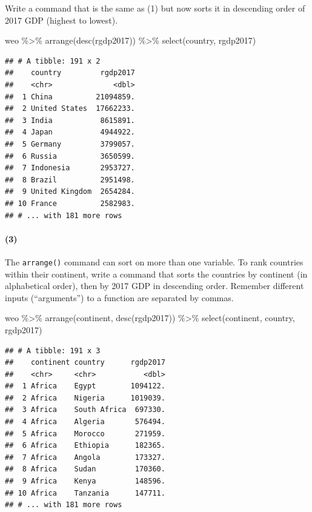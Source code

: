 \documentclass[11pt]{article}
\newcommand{\code}[1]{\colorbox{light-gray}{\texttt{#1}}}
\newenvironment{Shaded}{\begin{snugshade}}{\end{snugshade}}
\newcommand{\FunctionTok}[1]{\textcolor[rgb]{0.00,0.00,0.00}{#1}}
\newcommand{\NormalTok}[1]{#1}
\newcommand{\SpecialCharTok}[1]{\textcolor[rgb]{0.00,0.00,0.00}{#1}}
\begin{document}
Write a command that is the same as (1) but now sorts it in descending
order of 2017 GDP (highest to lowest).

\begin{Shaded}
\begin{Highlighting}[]
\NormalTok{weo }\SpecialCharTok{\%\textgreater{}\%}
  \FunctionTok{arrange}\NormalTok{(}\FunctionTok{desc}\NormalTok{(rgdp2017)) }\SpecialCharTok{\%\textgreater{}\%}
  \FunctionTok{select}\NormalTok{(country, rgdp2017)}
\end{Highlighting}
\end{Shaded}

\begin{verbatim}
## # A tibble: 191 x 2
##    country         rgdp2017
##    <chr>              <dbl>
##  1 China          21094859.
##  2 United States  17662233.
##  3 India           8615891.
##  4 Japan           4944922.
##  5 Germany         3799057.
##  6 Russia          3650599.
##  7 Indonesia       2953727.
##  8 Brazil          2951498.
##  9 United Kingdom  2654284.
## 10 France          2582983.
## # ... with 181 more rows
\end{verbatim}

\paragraph{(3)}

The \code{arrange()} command can sort on more than one variable. To rank
countries within their continent, write a command that sorts the
countries by continent (in alphabetical order), then by 2017 GDP in
descending order. Remember different inputs (``arguments'') to a
function are separated by commas.

\begin{Shaded}
\begin{Highlighting}[]
\NormalTok{weo }\SpecialCharTok{\%\textgreater{}\%}
  \FunctionTok{arrange}\NormalTok{(continent, }\FunctionTok{desc}\NormalTok{(rgdp2017)) }\SpecialCharTok{\%\textgreater{}\%}
  \FunctionTok{select}\NormalTok{(continent, country, rgdp2017)}
\end{Highlighting}
\end{Shaded}

\begin{verbatim}
## # A tibble: 191 x 3
##    continent country      rgdp2017
##    <chr>     <chr>           <dbl>
##  1 Africa    Egypt        1094122.
##  2 Africa    Nigeria      1019039.
##  3 Africa    South Africa  697330.
##  4 Africa    Algeria       576494.
##  5 Africa    Morocco       271959.
##  6 Africa    Ethiopia      182365.
##  7 Africa    Angola        173327.
##  8 Africa    Sudan         170360.
##  9 Africa    Kenya         148596.
## 10 Africa    Tanzania      147711.
## # ... with 181 more rows
\end{verbatim}
\end{document}
